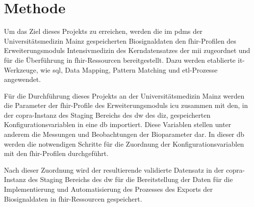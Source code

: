 \chapter{Methode} \label{ch:methods}

Um das Ziel dieses Projekts zu erreichen, werden die im \ac{pdms} der Universitätsmedizin Mainz gespeicherten Biosignaldaten den \ac{fhir}-Profilen des Erweiterungsmoduls \glqq Intensivmedizin\grqq{} des Kerndatensatzes der \ac{mii} zugeordnet und für die Überführung in \ac{fhir}-Ressourcen bereitgestellt. Dazu werden etablierte \ac{it}-Werkzeuge, wie \ac{sql}, Data Mapping, Pattern Matching und \ac{etl}-Prozesse angewendet.

Für die Durchführung dieses Projekts an der Universitätsmedizin Mainz werden die Parameter der \ac{fhir}-Profile des Erweiterungsmoduls \glqq\ac{icu}\grqq{} zusammen mit den, in der \ac{copra}-Instanz des Staging Bereichs des \ac{dw} des \ac{diz}, gespeicherten Konfigurationsvariablen in eine \ac{db} importiert. Diese Variablen stellen unter anderem die Messungen und Beobachtungen der Bioparameter dar. In dieser \ac{db} werden die notwendigen Schritte für die Zuordnung der Konfigurationsvariablen mit den \ac{fhir}-Profilen durchgeführt. 

Nach dieser Zuordnung wird der resultierende validierte Datensatz in der \ac{copra}-Instanz des Staging Bereichs des \ac{dw} für die Bereitstellung der Daten für die Implementierung und Automatisierung des Prozesses des Exports der Biosignaldaten in \ac{fhir}-Ressourcen gespeichert.